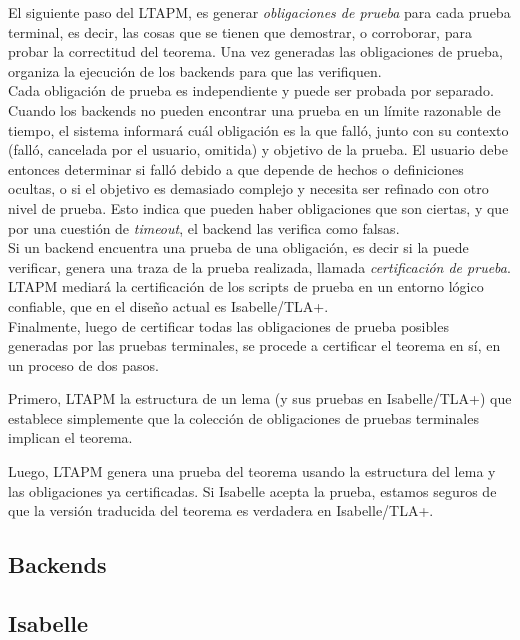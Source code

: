 \documentclass[spanish]{llncs}
\begin{document}
  El siguiente paso del LTAPM, es generar \textit{obligaciones de prueba} para cada prueba terminal, es decir, las cosas que se tienen que demostrar, o corroborar, para probar la correctitud del teorema. Una vez generadas las obligaciones de prueba, organiza la ejecución de los backends para que las verifiquen.
  \\
  
  Cada obligación de prueba es independiente y puede ser probada por separado. Cuando los backends no pueden encontrar una prueba en un límite razonable de tiempo, el sistema informará cuál obligación es la que falló, junto con su contexto (falló, cancelada por el usuario, omitida) y objetivo de la prueba.
  El usuario debe entonces determinar si falló debido a que depende de hechos o definiciones ocultas, o si el objetivo es demasiado complejo y necesita ser refinado con otro nivel de prueba. Esto indica que pueden haber obligaciones que son ciertas, y que por una cuestión de \textit{timeout},
  el backend las verifica como falsas.
  \\
  
  Si un backend encuentra una prueba de una obligación, es decir si la puede verificar, genera una traza de la prueba realizada, llamada \textit{certificación de prueba}. LTAPM  mediará la certificación de los scripts de prueba en un entorno lógico confiable, que en el diseño actual es Isabelle/TLA+.
  \\
  
  Finalmente, luego de certificar todas las obligaciones de prueba posibles generadas por las pruebas
  terminales, se procede a certificar el teorema en sí, en un proceso de dos pasos. 
  
  Primero, LTAPM  la
  estructura de un lema (y sus pruebas en Isabelle/TLA+) que establece simplemente que la colección de
  obligaciones de pruebas terminales implican el teorema.
  
  Luego, LTAPM genera una prueba del teorema usando la estructura del lema y las obligaciones ya certificadas. Si Isabelle acepta la prueba, estamos seguros de que la versión traducida del teorema es verdadera en Isabelle/TLA+.

  \subsection{Backends}
    \subsection{Isabelle}
    
\end{document}
